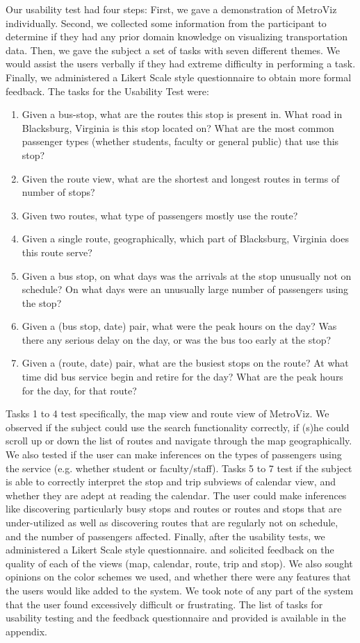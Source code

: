 \documentclass[journal]{vgtc}
\begin{document}
Our usability test had four steps: First, we gave a demonstration of MetroViz individually. Second, we collected some information from the participant to determine if they had any prior domain knowledge on visualizing transportation data. Then, we gave the subject a set of tasks with seven different themes. We would assist the users verbally if they had extreme difficulty in performing a task. Finally, we administered a Likert Scale style questionnaire to obtain more formal feedback. 
\noindent
The tasks for the Usability Test were: 
\begin{enumerate}
  \item Given a bus-stop, what are the routes this stop is present in. What road in Blacksburg, Virginia is this stop located on? What are the most common passenger types (whether students, faculty or general public) that use this stop?
  \item Given the route view, what are the shortest and longest routes in terms of number of stops?
  \item Given two routes, what type of passengers mostly use the route?
  \item Given a single route, geographically, which part of Blacksburg, Virginia does this route serve?
  \item Given a bus stop, on what days was the arrivals at the stop unusually not on schedule? On what days were an unusually large number of passengers using the stop?
  \item Given a (bus stop, date) pair, what were the peak hours on the day? Was there any serious delay on the day, or was the bus too early at the stop?
  \item Given a (route, date) pair, what are the busiest stops on the route? At what time did bus service begin and retire for the day? What are the peak hours for the day, for that route?
\end{enumerate}

Tasks 1 to 4 test specifically, the map view and route view of MetroViz. We observed if the subject could use the search functionality correctly, if (s)he could scroll up or down the list of routes and navigate through the map geographically. We also tested if the user can make inferences on the types of passengers using the service (e.g. whether student or faculty/staff). Tasks 5 to 7 test if the subject is able to correctly interpret the stop and trip subviews of calendar view, and whether they are adept at reading the calendar. The user could make inferences like discovering particularly busy stops and routes or routes and stops that are under-utilized as well as discovering routes that are regularly not on schedule, and the number of passengers affected. Finally, after the usability tests, we administered a Likert Scale style questionnaire. and solicited feedback on the quality of each of the views (map, calendar, route, trip and stop). We also sought opinions on the color schemes we used, and whether there were any features that the users would like added to the system. We took note of any part of the system that the user found excessively difficult or frustrating. The list of tasks for usability testing and the feedback questionnaire and provided is available in the appendix. 
\end{document}
